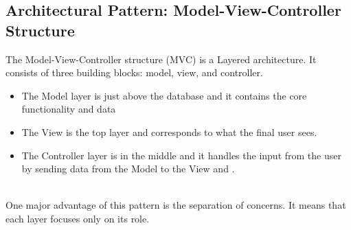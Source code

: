 \subsection{Architectural Pattern: Model-View-Controller Structure}
The Model-View-Controller structure (MVC) is a Layered architecture.
It consists of three building blocks: model, view, and controller.
\begin{itemize}
    \item The Model layer is just above the database and it contains the core functionality and data
    \item The View is the top layer and corresponds to what the final user sees. 
    \item The Controller layer is in the middle and it handles the input from the user by sending data from the Model to the View and 
    . 
\end{itemize}\\
One major advantage of this pattern is the separation of concerns. It means that each layer focuses only on its role.
